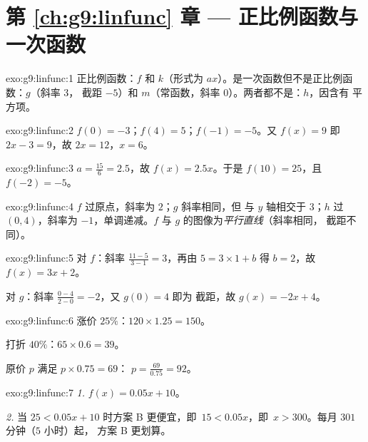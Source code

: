 \section*{第 \ref{ch:g9:linfunc} 章 --- 正比例函数与一次函数}

\begin{solution}{exo:g9:linfunc:1}
正比例函数：$f$ 和 $k$（形式为 $ax$）。是一次函数但不是正比例函数：$g$（斜率 $3$，
截距 $-5$）和 $m$（常函数，斜率 $0$）。两者都不是：$h$，因含有
平方项。
\end{solution}

\begin{solution}{exo:g9:linfunc:2}
$f(0) = -3$；$f(4) = 5$；$f(-1) = -5$。又 $f(x) = 9$ 即
$2x - 3 = 9$，故 $2x = 12$，$x = 6$。
\end{solution}

\begin{solution}{exo:g9:linfunc:3}
$a = \frac{15}{6} = 2.5$，故 $f(x) = 2.5x$。于是 $f(10) = 25$，且
$f(-2) = -5$。
\end{solution}

\begin{solution}{exo:g9:linfunc:4}
$f$ 过原点，斜率为 $2$；$g$ 斜率相同，但
与 $y$ 轴相交于 $3$；$h$ 过 $(0, 4)$，斜率为
$-1$，单调递减。$f$ 与 $g$ 的图像为\emph{平行直线}（斜率相同，
截距不同）。
\end{solution}

\begin{solution}{exo:g9:linfunc:5}
对 $f$：斜率 $\frac{11 - 5}{3 - 1} = 3$，再由 $5 = 3 \times 1 + b$
得 $b = 2$，故 $f(x) = 3x + 2$。

对 $g$：斜率 $\frac{0 - 4}{2 - 0} = -2$，又 $g(0) = 4$ 即为
截距，故 $g(x) = -2x + 4$。
\end{solution}

\begin{solution}{exo:g9:linfunc:6}
涨价 $25\%$：$120 \times 1.25 = 150$。

打折 $40\%$：$65 \times 0.6 = 39$。

原价 $p$ 满足 $p \times 0.75 = 69$：
$p = \frac{69}{0.75} = 92$。
\end{solution}

\begin{solution}{exo:g9:linfunc:7}
\emph{1.} $f(x) = 0.05x + 10$。

\emph{2.} 当 $25 < 0.05x + 10$ 时方案 B 更便宜，即\
$15 < 0.05x$，即\ $x > 300$。每月 $301$ 分钟（$5$ 小时）起，
方案 B 更划算。
\end{solution}

